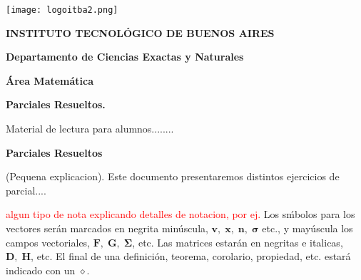 \documentclass[10pt, a4paper]{report}
\theoremstyle{definition} %
\begin{document}
    \begin{center}

        \thispagestyle{empty}  %

        \texttt{[image: logoitba2.png]}
        \medskip
        
        \textbf{\large{INSTITUTO  TECNOL\'OGICO DE BUENOS AIRES}\normalsize}
        
        \smallskip
        
        \textbf{\large  Departamento de Ciencias Exactas y Naturales}
        
        \smallskip
        \textbf{\large \'Area  Matem\'atica}
      
        \vspace{2 cm}
        
        \textbf{\Large \noindent \textbf{Parciales Resueltos.}}
             
        \vspace{1.5cm}
        
        \large  Material de lectura para alumnos........  \normalsize
    \end{center}
    
    \newpage

    \setcounter{page}{1}
    \begin{center}
        \textbf{ \noindent \textbf{Parciales Resueltos}}
    \end{center}
    \vspace{3cm}
      
    (Pequena explicacion).  Este documento presentaremos distintos ejercicios de parcial....
    \newpage

    \tableofcontents
        \setcounter{page}{1}
    \vfill
    \textcolor{red}{algun tipo de nota explicando detalles de notacion, por ej.} Los s\'mbolos para los vectores ser\'an marcados en negrita min\'uscula, $\mathbf{v},\;\mathbf{x},\;\mathbf{n},\;\boldsymbol{\sigma}$ etc., y may\'uscula los campos vectoriales, $\mathbf{F},\;\mathbf{G},\;\boldsymbol{\Sigma}$, etc. Las matrices estar\'an en negritas e italicas, $\boldsymbol{D},\;\boldsymbol{H}$, etc. El final de una definici\'on, teorema, corolario, propiedad, etc. estar\'a indicado con un $\diamond$.
\end{document}
